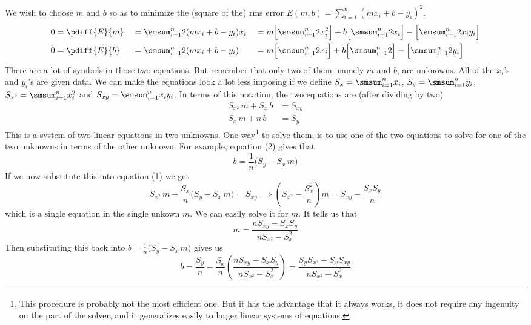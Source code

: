 \begin{solution}
We wish to choose $m$ and $b$ so as to minimize  the (square of the)
rms error $E(m,b)=\sum\limits_{i=1}^n (mx_i+b-y_i)^2$.
\begin{alignat*}{5}
0&=\pdiff{E}{m}&&=\smsum_{i=1}^n 2(mx_i+b-y_i)x_i
&&=m\Big[\smsum_{i=1}^n 2x^2_i\Big]+b\Big[\smsum_{i=1}^n 2x_i\Big]
-\Big[\smsum_{i=1}^n 2x_iy_i\Big]\\
0&=\pdiff{E}{b}&&=\smsum_{i=1}^n 2(mx_i+b-y_i)
&&=m\Big[\smsum_{i=1}^n 2x_i\Big]+b\Big[\smsum_{i=1}^n 2\Big]
-\Big[\smsum_{i=1}^n 2y_i\Big]
\end{alignat*}
There are a lot of symbols in those two equations. But remember that only two
of them, namely $m$ and $b$, are unknowns. All of the $x_i$'s and $y_i$'s are given data. We can make the equations look a lot less imposing if we define $S_x=\smsum_{i=1}^n x_i$, 
$S_y=\smsum_{i=1}^n y_i$, $S_{x^2}=\smsum_{i=1}^n x^2_i$ and
$S_{xy}=\smsum_{i=1}^n x_iy_i$. In terms of this notation, the two
 equations are (after dividing by two)
\begin{align*}
S_{x^2}\, m+S_x\, b&=S_{xy} \tag{\rm 1}\\
S_{x}\,m+n\,b&=S_{y} \tag{\rm 2}
\end{align*}
This is a system of two linear equations in two unknowns.
One way\footnote{This procedure is probably not the most efficient one. But it has the advantage that it always works, it does not require any ingenuity on the part of the solver, and it generalizes easily to larger linear systems of equations.} to solve them, is to use one of the two equations to solve
for one of the two unknowns in terms of the other unknown. For example,
equation (2) gives that
\begin{equation*}
b=\frac{1}{n}\big(S_y-S_x\,m\big)
\end{equation*}
If we now substitute this into equation (1) we get
\begin{equation*}
S_{x^2}\, m+\frac{S_x}{n}\big(S_y-S_x\,m\big)=S_{xy}
\implies \left(S_{x^2}-\frac{S_x^2}{n}\right)m = S_{xy} -\frac{S_xS_y}{n}
\end{equation*}
which is a single equation in the single unkown $m$. We can easily solve it for $m$. It tells us that
\begin{equation*}
m=\frac{nS_{xy}-S_xS_y}{nS_{x^2} -S_x^2}
\end{equation*}
Then substituting this back into $b=\frac{1}{n}\big(S_y-S_x\,m\big)$ gives us
\begin{equation*}
b=\frac{S_y}{n} 
      -\frac{S_x}{n}\left(\frac{nS_{xy}-S_xS_y}{nS_{x^2} -S_x^2}\right)
=\frac{S_yS_{x^2}-S_xS_{xy}}{nS_{x^2} -S_x^2}
\end{equation*}

\end{solution}

